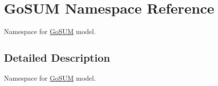 \hypertarget{namespace_go_s_u_m}{\section{Go\-S\-U\-M Namespace Reference}
\label{namespace_go_s_u_m}
}


Namespace for \hyperlink{struct_go_s_u_m}{Go\-S\-U\-M} model.  




\subsection{Detailed Description}
Namespace for \hyperlink{struct_go_s_u_m}{Go\-S\-U\-M} model. 